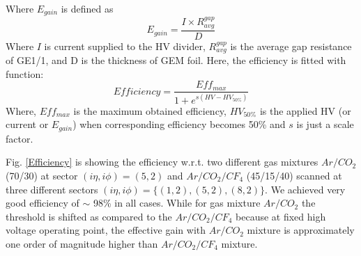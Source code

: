 Where $E_{gain}$ is defined as
\begin{equation}
E_{gain} = \frac{I\times R_{avg}^{gap}}{D}
\end{equation}
Where $I$ is current supplied to the HV divider, $R_{avg}^{gap}$ is the average gap resistance of GE1/1, and D is the thickness of GEM foil.
Here, the efficiency is fitted with function:
\begin{equation}
    Efficiency = \frac{Eff_{max}}{1+e^{s(HV-HV_{50\%})}}
\end{equation}
Where, $Eff_{max}$ is the maximum obtained efficiency, $HV_{50\%}$ is the applied HV (or current or $E_{gain}$) when corresponding efficiency becomes 50\% and $s$ is just a scale factor.

Fig. \ref{Efficiency} is showing the efficiency w.r.t. two different gas mixtures $Ar/CO_2$ (70/30) at sector $(i\eta,i\phi)=(5,2)$ and $Ar/CO_2/CF_4$ (45/15/40) scanned at three different sectors $(i\eta,i\phi)=\{(1,2),(5,2),(8,2)\}$. We achieved very good efficiency of $\sim$ 98\% in all cases. While for gas mixture $Ar/CO_2$ the threshold is shifted as compared to the $Ar/CO_2/CF_4$ because at fixed high voltage operating point, the effective gain with $Ar/CO_2$  mixture is approximately one order of magnitude higher than $Ar/CO_2/CF_4$ mixture.
      

